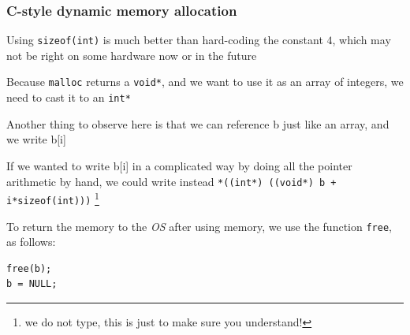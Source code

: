 \documentclass{beamer}
\begin{document}
\begin{frame}[fragile]
\frametitle{C-style dynamic memory allocation}

Using \verb|sizeof(int)| is much better than 
hard-coding the constant $4$, which
may not be right on some hardware now or in the future

\medskip

Because \verb|malloc| returns a \verb|void*|, and we want
to use it as an array of integers, we need to cast it to an \verb|int*|

\medskip

Another thing to observe here is that we can reference b just like an array, and we write b[i]

\medskip

If we wanted to write b[i] in a complicated way by doing all the pointer arithmetic by hand, we could
write instead \verb|*((int*) ((void*) b + i*sizeof(int)))|
\footnote{we do not type, this is just to make sure you understand!}

\medskip

To return the memory to the \emph{OS} after using memory, 
we use the function \verb|free|, as follows:

\begin{verbatim}
free(b);
b = NULL;
\end{verbatim}


\end{frame}
\end{document}
